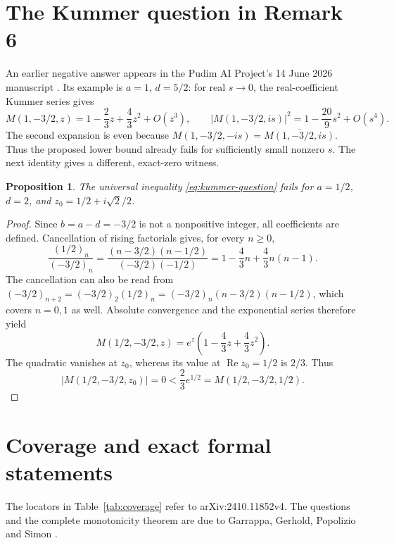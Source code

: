 \documentclass[11pt]{article}
\newtheorem{proposition}[theorem]{Proposition}
\newcommand{\Rea}{\operatorname{Re}}
\begin{document}
\section{The Kummer question in Remark 6}
An earlier negative answer appears in the Pudim AI Project's
14 June 2026 manuscript \cite{kummer-prior}. Its example is
$a=1$, $d=5/2$: for real $s\to0$, the real-coefficient Kummer series gives
\[
 M(1,-3/2,z)=1-\frac23z+\frac43z^2+O(z^3),\qquad
 |M(1,-3/2,is)|^2=1-\frac{20}{9}s^2+O(s^4).
\]
The second expansion is even because
$M(1,-3/2,-is)=\overline{M(1,-3/2,is)}$.
Thus the proposed lower bound already fails for sufficiently small
nonzero $s$. The next identity gives a different, exact-zero witness.

\begin{proposition}\label{prop:kummer}
The universal inequality \eqref{eq:kummer-question} fails for
$a=1/2$, $d=2$, and $z_0=1/2+i\sqrt2/2$.
\end{proposition}
\begin{proof}
Since $b=a-d=-3/2$ is not a nonpositive integer, all coefficients
are defined. Cancellation of rising factorials gives, for every $n\ge0$,
\[
 \frac{(1/2)_n}{(-3/2)_n}
 =\frac{(n-3/2)(n-1/2)}{(-3/2)(-1/2)}
 =1-\frac43n+\frac43n(n-1).
\]
The cancellation can also be read from
$(-3/2)_{n+2}=(-3/2)_2(1/2)_n
=(-3/2)_n(n-3/2)(n-1/2)$, which covers $n=0,1$ as well.
Absolute convergence and the exponential series therefore yield
\[
 M(1/2,-3/2,z)
 =e^z\left(1-\frac43z+\frac43z^2\right).
\]
The quadratic vanishes at $z_0$, whereas its value at $\Rea z_0=1/2$
is $2/3$. Thus
\[
 |M(1/2,-3/2,z_0)|=0<\frac23e^{1/2}
 =M(1/2,-3/2,1/2).
\]
\end{proof}

\section{Coverage and exact formal statements}
The locators in Table~\ref{tab:coverage} refer to arXiv:2410.11852v4.
The questions and the complete monotonicity theorem are due to
Garrappa, Gerhold, Popolizio and Simon \cite{ggps}.
\end{document}
